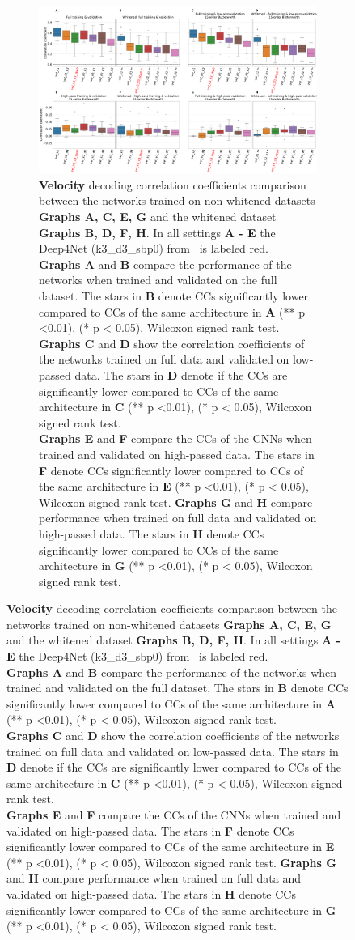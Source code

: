 \begin{figure}[!htbp]
\begin{subfigure}[a]{\textwidth}
   \includegraphics[width=1\linewidth]{img/ch4/vel-pw-vs-non-pw-performance}
   \caption{\textbf{Velocity} decoding correlation coefficients comparison between the networks trained on non-whitened datasets \textbf{Graphs A, C, E, G} and the whitened dataset \textbf{Graphs B, D, F, H}.
   In all settings \textbf{A - E} the Deep4Net (k3\_d3\_sbp0) from~\cite{Hammer-2021} is labeled red.
   \\ \textbf{Graphs A} and \textbf{B} compare the performance of the networks when trained and validated on the full dataset.
   The stars in \textbf{B} denote CCs significantly lower compared to CCs of the same architecture in \textbf{A} (** p <0.01), (* p < 0.05), Wilcoxon signed rank test.
   \\\textbf{Graphs C} and \textbf{D} show the correlation coefficients of the networks trained on full data and validated on low-passed data.
   The stars in \textbf{D} denote if the CCs are significantly lower compared to CCs of the same architecture in \textbf{C} (** p <0.01), (* p < 0.05), Wilcoxon signed rank test.
   \\\textbf{Graphs E} and \textbf{F} compare the CCs of the CNNs when trained and validated on high-passed data.
   The stars in \textbf{F} denote CCs significantly lower compared to CCs of the same architecture in \textbf{E} (** p <0.01), (* p < 0.05), Wilcoxon signed rank test.
   \textbf{Graphs G} and \textbf{H} compare performance when trained on full data and validated on high-passed data.
   The stars in \textbf{H} denote CCs significantly lower compared to CCs of the same architecture in \textbf{G} (** p <0.01), (* p < 0.05), Wilcoxon signed rank test.}
   \label{fig:vel-pw-performance}
\end{subfigure}
\end{figure}
\clearpage   

